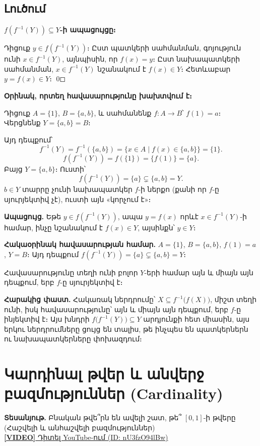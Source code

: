 \documentclass[12pt, a4paper]{article}
\begin{document}
\subsection*{Լուծում}

\textbf{$f(f^{-1}(Y)) \subseteq Y$-ի ապացույցը։}

Դիցուք $y \in f(f^{-1}(Y))$։ Ըստ պատկերի սահմանման, գոյություն ունի $x \in f^{-1}(Y)$,
այնպիսին, որ $f(x) = y$։ Ըստ նախապատկերի սահմանման, $x \in f^{-1}(Y)$ նշանակում է $f(x) \in Y$։
Հետևաբար $y = f(x) \in Y$։ \qed

\bigskip
\textbf{Օրինակ, որտեղ հավասարությունը խախտվում է։}

Դիցուք $A = \{1\}$, $B = \{a, b\}$, և սահմանենք $f : A \to B$՝ $f(1) = a$։
Վերցնենք $Y = \{a, b\} = B$։

Այդ դեպքում՝
\[
  f^{-1}(Y) = f^{-1}(\{a,b\}) = \{x \in A \mid f(x) \in \{a,b\}\} = \{1\}.
\]
\[
  f(f^{-1}(Y)) = f(\{1\}) = \{f(1)\} = \{a\}.
\]
Բայց $Y = \{a, b\}$։ Ուստի՝
\[
  f(f^{-1}(Y)) = \{a\} \subsetneq \{a, b\} = Y.
\]
$b \in Y$ տարրը չունի նախապատկեր $f$-ի ներքո (քանի որ $f$-ը սյուրյեկտիվ չէ), ուստի այն «կորչում է»։

\begin{answerbox}
\textbf{Ապացույց.} Եթե $y \in f(f^{-1}(Y))$, ապա $y = f(x)$ որևէ $x \in f^{-1}(Y)$-ի համար,
ինչը նշանակում է $f(x) \in Y$, այսինքն՝ $y \in Y$։

\textbf{Հակաօրինակ հավասարության համար.}\; $A = \{1\}$, $B = \{a,b\}$, $f(1) = a$, $Y = B$։
Այդ դեպքում $f(f^{-1}(Y)) = \{a\} \subsetneq \{a,b\} = Y$։

Հավասարությունը տեղի ունի բոլոր $Y$-երի համար այն և միայն այն դեպքում, երբ $f$-ը սյուրյեկտիվ է։
\end{answerbox}

\bigskip
\textbf{Հարակից փաստ.}\; Հակառակ ներդրումը՝ $X \subseteq f^{-1}\bigl(f(X)\bigr)$, միշտ տեղի ունի, իսկ հավասարությունը՝ այն և միայն այն դեպքում, երբ $f$-ը ինյեկտիվ է։ Այս խնդրի $f\bigl(f^{-1}(Y)\bigr) \subseteq Y$ արդյունքի հետ միասին, այս երկու ներդրումները ցույց են տալիս, թե ինչպես են պատկերներն ու նախապատկերները փոխազդում։

\newpage
\section{Կարդինալ թվեր և անվերջ բազմություններ (Cardinality)}

\begin{tcolorbox}[colback=white, colframe=gray!50, arc=2mm, width=0.9\textwidth, halign=center]
  \textbf{Տեսանյութ.} Բնական թվե՞րն են ավելի շատ, թե՞ $[0, 1]$-ի թվերը \\
  (Հաշվելի և անհաշվելի բազմություններ) \\
  \href{https://youtu.be/nU3fzO94lBw}{\textbf{[VIDEO]} Դիտել YouTube-ում (ID: nU3fzO94lBw)}
\end{tcolorbox}
\end{document}
